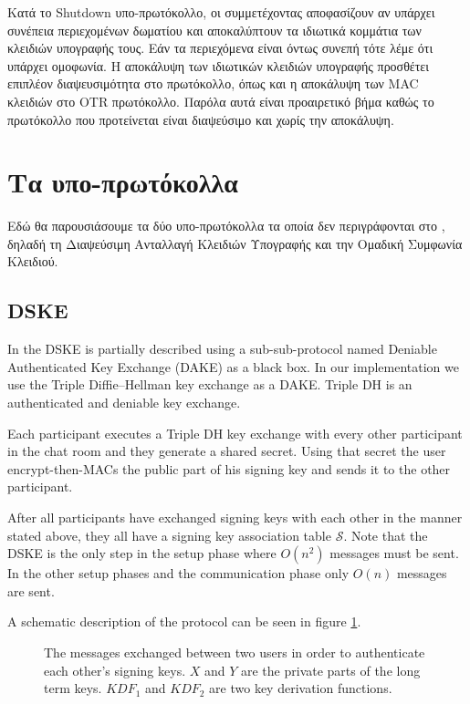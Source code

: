 Κατά το Shutdown υπο-πρωτόκολλο, οι συμμετέχοντας αποφασίζουν αν υπάρχει συνέπεια περιεχομένων δωματίου και αποκαλύπτουν τα ιδιωτικά κομμάτια των κλειδιών υπογραφής τους.
Εάν τα περιεχόμενα είναι όντως συνεπή τότε λέμε ότι υπάρχει ομοφωνία.
Η αποκάλυψη των ιδιωτικών κλειδιών υπογραφής προσθέτει επιπλέον διαψευσιμότητα στο πρωτόκολλο, όπως και η αποκάλυψη των MAC κλειδιών στο OTR πρωτόκολλο.
Παρόλα αυτά είναι προαιρετικό βήμα καθώς το πρωτόκολλο που προτείνεται είναι διαψεύσιμο και χωρίς την αποκάλυψη.

\section{Τα υπο-πρωτόκολλα}
\label{subprots}

Εδώ θα παρουσιάσουμε τα δύο υπο-πρωτόκολλα τα οποία δεν περιγράφονται στο \cite{mpotr}, δηλαδή τη Διαψεύσιμη Ανταλλαγή Κλειδιών Υπογραφής και την Ομαδική Συμφωνία Κλειδιού.

\subsection{DSKE}
\label{dske_subprot}

In \cite{mpotr} the DSKE is partially described using a sub-sub-protocol named Deniable Authenticated Key Exchange (DAKE) as a black box.
In our implementation we use the Triple Diffie--Hellman key exchange as a DAKE.
Triple DH is an authenticated and deniable key exchange.

Each participant executes a Triple DH key exchange with every other participant in the chat room and they generate a shared secret.
Using that secret the user encrypt-then-MACs the public part of his signing key and sends it to the other participant.

After all participants have exchanged signing keys with each other in the manner stated above, they all have a signing key association table $\mathcal{S}$.
Note that the DSKE is the only step in the setup phase where $O(n^2)$ messages must be sent.
In the other setup phases and the communication phase only $O(n)$ messages are sent.

A schematic description of the protocol can be seen in figure \ref{den_ake_schematic}.

\begin{figure}[h]
  
    \caption{The messages exchanged between two users in order to authenticate each other's signing keys. $X$ and $Y$ are the private parts of the long term keys. $KDF_1$ and $KDF_2$ are two key derivation functions.}
  \label{den_ake_schematic}
\end{figure}

